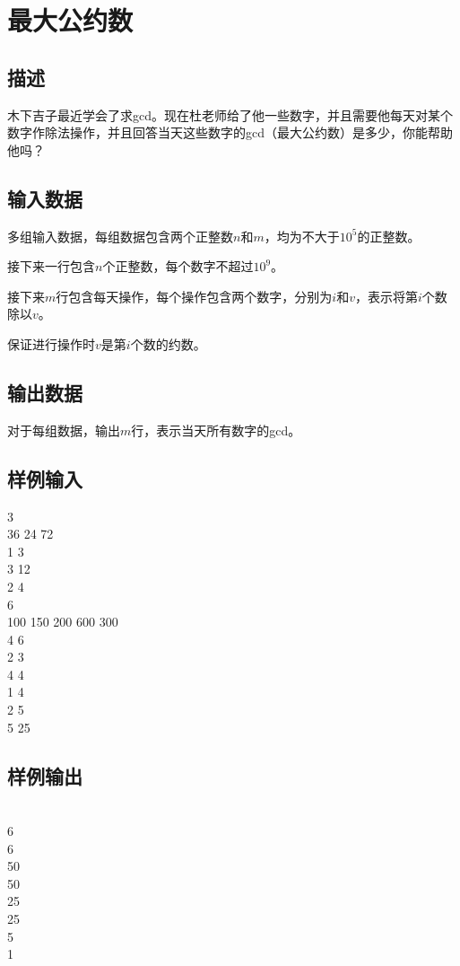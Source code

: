 \ifx\allfiles\undefined

\fi


\section{最大公约数}
\subsection*{描述}
木下吉子最近学会了求gcd。现在杜老师给了他一些数字，并且需要他每天对某个数字作除法操作，并且回答当天这些数字的gcd（最大公约数）是多少，你能帮助他吗？

\subsection*{输入数据}
多组输入数据，每组数据包含两个正整数$n$和$m$，均为不大于$10^5$的正整数。

接下来一行包含$n$个正整数，每个数字不超过$10^9$。

接下来$m$行包含每天操作，每个操作包含两个数字，分别为$i$和$v$，表示将第$i$个数除以$v$。

保证进行操作时$v$是第$i$个数的约数。

\subsection*{输出数据}
对于每组数据，输出$m$行，表示当天所有数字的gcd。

\subsection*{样例输入}
 3\\
36 24 72\\
1 3\\
3 12\\
2 4\\

 6\\
100 150 200 600 300\\
4 6\\
2 3\\
4 4\\
1 4\\
2 5\\
5 25

\subsection*{样例输出}
\\
6\\
6\\
50\\
50\\
25\\
25\\
5\\
1


\ifx\allfiles\undefined

\fi